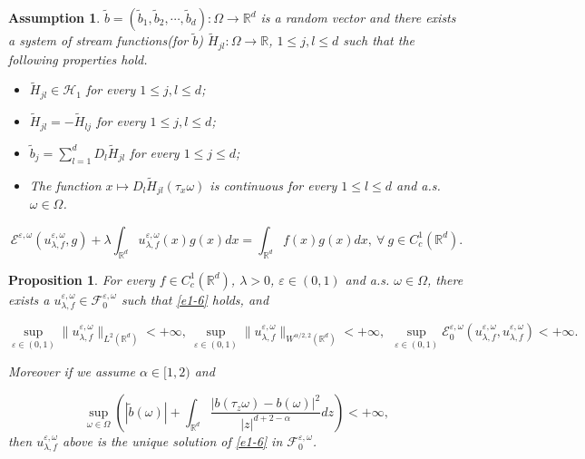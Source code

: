 \documentclass[10pt,a4paper]{amsart}
\newtheorem{assumption}{Assumption}
\newtheorem{proposition}{Proposition}
\def\EE{{\mathcal E}}
\def\FF{{\mathcal F}}
\newcommand{\HH}{\mathcal{H}}
\newcommand{\R}{\mathds R}
\newcommand{\e}{\varepsilon}
\renewcommand{\le}{\leqslant}
\newcommand{\w}{\omega}
\begin{document}
\begin{assumption}\label{a1-2}
$\tilde b=(\tilde b_1,\tilde b_2,\cdots, \tilde b_d):\Omega \to \R^d$ is a random vector
and there exists a system of stream functions(for $\tilde b$) $\tilde H_{jl}:\Omega \to \R$, $1\le j,l\le d$ such that
the following properties hold.
\begin{itemize}
\item [(i)] $\tilde H_{jl}\in \HH_{1}$ for every $1\le j,l \le d$;

\item [(ii)] $\tilde H_{jl}=-\tilde H_{lj}$ for every $1\le j,l \le d$;

\item [(iii)] $\tilde b_j=\sum_{l=1}^d D_l \tilde H_{jl}$ for every $1\le j \le d$;

\item [(iv)] The function $x\mapsto D_l \tilde H_{jl}(\tau_x \w)$ is continuous for every $1\le l \le d$ and a.s. $\w\in \Omega$.
\end{itemize}
\end{assumption}

\begin{equation}\label{e1-6}
\EE^{\e,\w} (u_{\lambda,f}^{\e,\w},g)+\lambda\int_{\R^d}u_{\lambda,f}^{\e,\w}(x)g(x)dx=\int_{\R^d}f(x)g(x)dx,\ \forall\ g\in C_c^1(\R^d).
\end{equation}

\begin{proposition}\label{t1-1}
For every $f\in C_c^1(\R^d)$, $\lambda>0$, $\e\in (0,1)$ and a.s. $\w\in \Omega$, there exists a $u_{\lambda,f}^{\e,\w}\in \FF_0^{\e,\w}$ such that
\eqref{e1-6} holds,
and

\begin{equation}\label{t1-1-1a}
\sup_{\e\in (0,1)}\|u_{\lambda,f}^{\e,\w}\|_{L^2(\R^d)}<+\infty,\ \sup_{\e\in (0,1)}\|u_{\lambda,f}^{\e,\w}\|_{W^{\alpha/2,2}(\R^d)}<+\infty,\ \
\sup_{\e\in (0,1)}\EE_0^{\e,\w}\left(u_{\lambda,f}^{\e,\w},u_{\lambda,f}^{\e,\w}\right)<+\infty.
\end{equation}

Moreover if we assume $\alpha\in [1,2)$ and

\begin{equation}\label{t1-1-2a}
\sup_{\w\in \Omega}\left(|\tilde b(\w)|+\int_{\R^d}\frac{|b(\tau_z \w)-b(\w)|^2}{|z|^{d+2-\alpha}}dz\right)<+\infty,
\end{equation}
then $u_{\lambda,f}^{\e,\w}$ above is the unique solution of \eqref{e1-6} in $\FF_0^{\e,\w}$.
\end{proposition}
\end{document}
